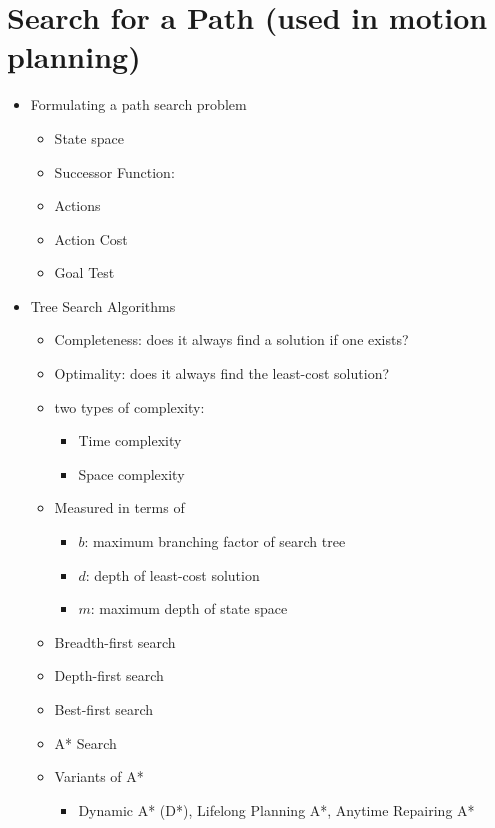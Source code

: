 \documentclass[../main.tex]{subfiles}
\begin{document}
    \section{Search for a Path (used in motion planning)}
    \begin{itemize}
        \item Formulating a path search problem
        \begin{itemize}
            \item State space
            \item Successor Function:
            \item Actions
            \item Action Cost
            \item Goal Test
        \end{itemize}
        \item Tree Search Algorithms
        \begin{itemize}
            \item Completeness: does it always find a solution if one exists?
            \item Optimality: does it always find the least-cost solution?
            \item two types of complexity:
            \begin{itemize}
                \item Time complexity
                \item Space complexity
            \end{itemize}
            \item Measured in terms of
            \begin{itemize}
                \item $b$: maximum branching factor of search tree
                \item $d$: depth of least-cost solution
                \item $m$: maximum depth of state space
            \end{itemize}
            \item Breadth-first search
            \item Depth-first search
            \item Best-first search
            \item A* Search
            \item Variants of A*
            \begin{itemize}
                \item Dynamic A* (D*), Lifelong Planning A*, Anytime Repairing A*
            \end{itemize}
        \end{itemize}
    \end{itemize}
\end{document}
